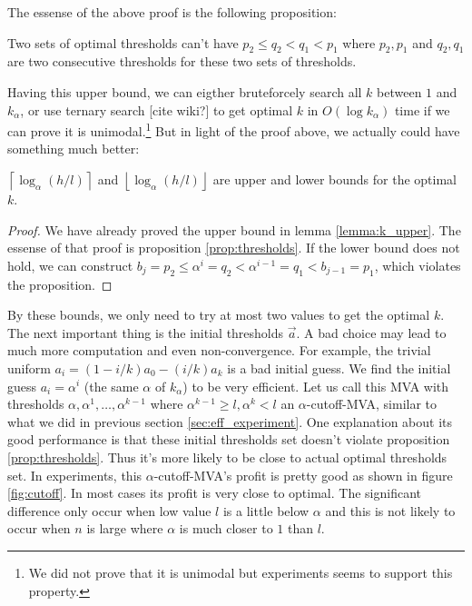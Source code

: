 The essense of the above proof is the following proposition:

\begin{proposition}\label{prop:thresholds}
Two sets of optimal thresholds can't have $p_2 \leq q_2 < q_1 < p_1$ where
$p_2, p_1$ and $q_2, q_1$ are two consecutive thresholds for these two sets of
thresholds.
\end{proposition}

Having this upper bound, we can eigther bruteforcely search all $k$ between $1$
and $k_\alpha$, or use ternary search [cite wiki?] to get optimal $k$ in
$O(\log k_\alpha)$ time if we can prove it is unimodal.\footnote{We did not
prove that it is unimodal but experiments seems to support this property.}
But in light of the proof above, we actually could have something much better:

\begin{theorem}\label{theorem:k_bounds}
$\left\lceil \log_{\alpha} \left(h/l\right) \right\rceil$ and 
$\left\lfloor \log_{\alpha} \left(h/l\right) \right\rfloor$ are upper
and lower bounds for the optimal $k$. 
\end{theorem}

\begin{proof}
We have already proved the upper bound in lemma \ref{lemma:k_upper}. The
essense of that proof is proposition \ref{prop:thresholds}. If the lower bound
does not hold, we can construct $b_j = p_2 \leq \alpha^i = q_2 < \alpha^{i-1} =
q_1 < b_{j-1} = p_1$, which violates the proposition. 
\end{proof}

By these bounds, we only need to try at most two values to get the optimal $k$.
The next important thing is the initial thresholds $\vec a$. A bad choice may
lead to much more computation and even non-convergence. For example, the
trivial uniform $a_i = (1-i/k)a_0 - (i/k) a_k$ is a bad initial guess. We find
the initial guess $a_i = \alpha^i$ (the same $\alpha$ of $k_\alpha$) to be very
efficient.  Let us call this MVA with thresholds $\alpha, \alpha^1, \ldots,
\alpha^{k-1}$ where $\alpha^{k-1} \geq l, \alpha^k < l$ an $\alpha$-cutoff-MVA,
similar to what we did in previous section \ref{sec:eff_experiment}.  
One explanation about its good performance is that these initial thresholds set
doesn't violate proposition \ref{prop:thresholds}. Thus it's more likely to be
close to actual optimal thresholds set.
In experiments, this $\alpha$-cutoff-MVA's profit is pretty good as shown
in figure \ref{fig:cutoff}. In most cases its profit is very close to optimal.
The significant difference only occur when low value $l$ is a little below
$\alpha$ and this is not likely to occur when $n$ is large where $\alpha$ is
much closer to $1$ than $l$.

